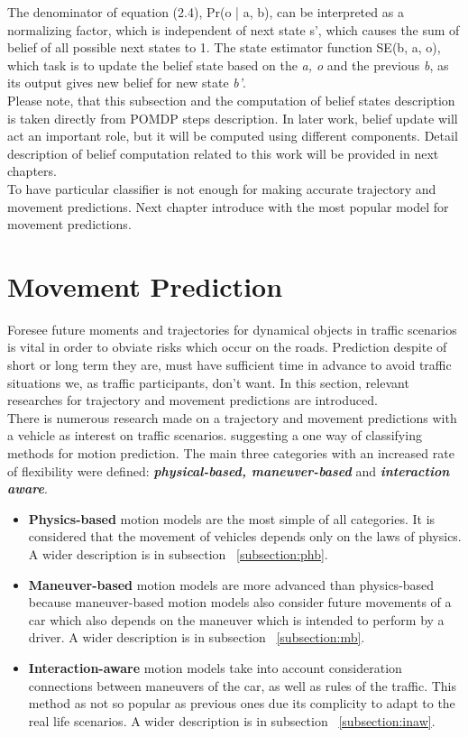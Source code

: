 The denominator of equation (2.4), Pr(o | a, b), can be interpreted as a normalizing factor, which is independent of next state s', which causes the sum of belief of all possible next states to 1. The state estimator function SE(b, a, o), which task is to update the belief state based on the \textit{a, o} and the previous \textit{b}, as its output gives new belief for new state \textit{b'}. \\
Please note, that this subsection and the computation of belief states description is taken directly from \gls{POMDP} steps description. In later work, belief update will act an important role, but it will be computed using different components. Detail description of belief computation related to this work will be provided in next chapters. \\
To have particular classifier is not enough for making accurate trajectory and movement predictions. Next chapter introduce with the most popular model for movement predictions.

\section{Movement Prediction}

Foresee future moments and trajectories for dynamical objects in traffic scenarios is vital in order to obviate risks which occur on the roads. Prediction despite of short or long term they are, must have sufficient time in advance to avoid traffic situations we, as traffic participants, don't want. In this section, relevant researches for trajectory and movement predictions are introduced. \\
There is numerous research made on a trajectory and movement predictions with a vehicle as interest on traffic scenarios. \cite{ClassificationI} suggesting a one way of classifying methods for motion prediction. The main three categories with an increased rate of flexibility were defined: \textbf{\textit{physical-based, maneuver-based}} and \textbf{\textit{interaction aware}}.

\begin{itemize}
	\item \textbf{Physics-based} motion models are the most simple of all categories. It is considered that the movement of vehicles depends only on the laws of physics. A wider description is in subsection ~\ref{subsection:phb}.
	\item \textbf{Maneuver-based} motion models are more advanced than physics-based because maneuver-based motion models also consider future movements of a car which also depends on the maneuver which is intended to perform by a driver. A wider description is in subsection ~\ref{subsection:mb}.
	\item \textbf{Interaction-aware} motion models take into account consideration connections between maneuvers of the car, as well as rules of the traffic. This method as not so popular as previous ones due its complicity to adapt to the real life scenarios. A wider description is in subsection ~\ref{subsection:inaw}.
\end{itemize}

